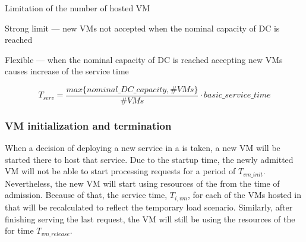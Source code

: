 

Limitation of the number of hosted VM

Strong limit --- new VMs not accepted when the nominal capacity of DC is reached 

Flexible --- when the nominal capacity of DC is reached accepting new VMs causes increase of the service time

\begin{equation}
T_{serv} = \frac{max \lbrace nominal\_DC\_capacity, \#VMs \rbrace}{\#VMs} \cdot basic\_service\_time
\end{equation}

\subsubsection{VM initialization and termination}
When a decision of deploying a new service in a \dc{} is taken, a new VM will be started there to host that service.
Due to the startup time, the newly admitted VM will not be able to start processing requests for a period of $T_{vm\_init}$. 
Nevertheless, the new VM will start using resources of the \dc{} from the time of admission.
Because of that, the service time, $T_{i,vm}$, for each of the VMs hosted in that \dc{} will be recalculated to reflect the temporary load scenario.
Similarly, after finishing serving the last request, the VM will still be using the resources of the \dc{} for time $T_{vm\_release}$.


